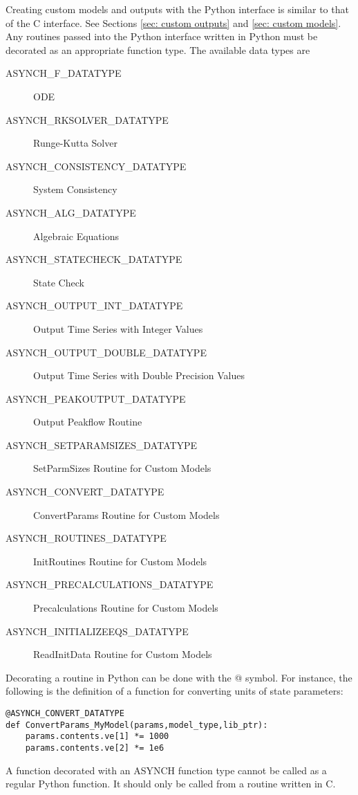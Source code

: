 \documentclass[12pt]{article}
\begin{document}
Creating custom models and outputs with the Python interface is similar to that of the C interface. See Sections \ref{sec: custom outputs} and \ref{sec: custom models}. Any routines passed into the Python interface written in Python must be decorated as an appropriate function type. The available data types are
\begin{description}
 \item[ASYNCH\_F\_DATATYPE] \raggedright ODE
 \item[ASYNCH\_RKSOLVER\_DATATYPE] Runge-Kutta Solver
 \item[ASYNCH\_CONSISTENCY\_DATATYPE] System Consistency
 \item[ASYNCH\_ALG\_DATATYPE] Algebraic Equations
 \item[ASYNCH\_STATECHECK\_DATATYPE] State Check
 \item[ASYNCH\_OUTPUT\_INT\_DATATYPE] Output Time Series with Integer Values
 \item[ASYNCH\_OUTPUT\_DOUBLE\_DATATYPE] Output Time Series with Double Precision Values
 \item[ASYNCH\_PEAKOUTPUT\_DATATYPE] Output Peakflow Routine
 \item[ASYNCH\_SETPARAMSIZES\_DATATYPE] SetParmSizes Routine for Custom Models
 \item[ASYNCH\_CONVERT\_DATATYPE] ConvertParams Routine for Custom Models
 \item[ASYNCH\_ROUTINES\_DATATYPE] InitRoutines Routine for Custom Models
 \item[ASYNCH\_PRECALCULATIONS\_DATATYPE] Precalculations Routine for Custom Models
 \item[ASYNCH\_INITIALIZEEQS\_DATATYPE] ReadInitData Routine for Custom Models
\end{description}
Decorating a routine in Python can be done with the {@} symbol. For instance, the following is the definition of a function for converting units of state parameters:
\begin{lstlisting}[style=PythonStyle]
@ASYNCH_CONVERT_DATATYPE
def ConvertParams_MyModel(params,model_type,lib_ptr):
	params.contents.ve[1] *= 1000
	params.contents.ve[2] *= 1e6
\end{lstlisting}
A function decorated with an ASYNCH function type cannot be called as a regular Python function. It should only be called from a routine written in C.
\end{document}
